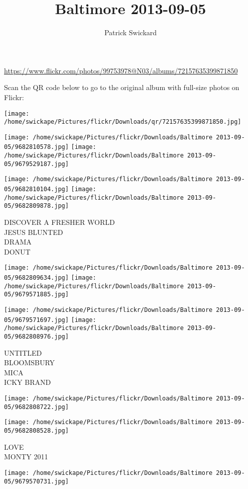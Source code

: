 \documentclass[10pt,letterpaper]{article}
\title{Baltimore 2013-09-05}
\author{Patrick Swickard}
\date{}
\begin{document}
\maketitle

\url{https://www.flickr.com/photos/99753978@N03/albums/72157635399871850}

Scan the QR code below to go to the original album with full-size photos on Flickr:

\texttt{[image: /home/swickape/Pictures/flickr/Downloads/qr/72157635399871850.jpg]}
\pagebreak

\texttt{[image: /home/swickape/Pictures/flickr/Downloads/Baltimore 2013-09-05/9682810578.jpg]}
\texttt{[image: /home/swickape/Pictures/flickr/Downloads/Baltimore 2013-09-05/9679529187.jpg]}

\texttt{[image: /home/swickape/Pictures/flickr/Downloads/Baltimore 2013-09-05/9682810104.jpg]}
\texttt{[image: /home/swickape/Pictures/flickr/Downloads/Baltimore 2013-09-05/9682809878.jpg]}

DISCOVER A FRESHER WORLD\\
JESUS BLUNTED\\
DRAMA\\
DONUT
\pagebreak

\texttt{[image: /home/swickape/Pictures/flickr/Downloads/Baltimore 2013-09-05/9682809634.jpg]}
\texttt{[image: /home/swickape/Pictures/flickr/Downloads/Baltimore 2013-09-05/9679571885.jpg]}

\texttt{[image: /home/swickape/Pictures/flickr/Downloads/Baltimore 2013-09-05/9679571697.jpg]}
\texttt{[image: /home/swickape/Pictures/flickr/Downloads/Baltimore 2013-09-05/9682808976.jpg]}

UNTITLED\\
BLOOMSBURY\\
MICA\\
ICKY BRAND
\pagebreak

\texttt{[image: /home/swickape/Pictures/flickr/Downloads/Baltimore 2013-09-05/9682808722.jpg]}

\vspace{0.25in}
\texttt{[image: /home/swickape/Pictures/flickr/Downloads/Baltimore 2013-09-05/9682808528.jpg]}

LOVE\\
MONTY 2011
\pagebreak

\texttt{[image: /home/swickape/Pictures/flickr/Downloads/Baltimore 2013-09-05/9679570731.jpg]}
\end{document}
